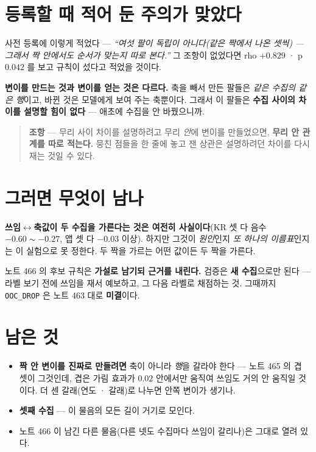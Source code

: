 \documentclass[11pt]{article}
\begin{document}
\section{등록할 때 적어 둔 주의가 맞았다}

사전 등록에 이렇게 적었다 --- \emph{``여섯 팔이 독립이 아니다(같은 짝에서
나온 셋씩) --- 그래서 짝 안에서도 순서가 맞는지 따로 본다.''} 그 조항이
없었다면 rho $+0.829$ · p $0.042$ 를 보고 규칙이 섰다고 적었을 것이다.

\textbf{변이를 만드는 것과 변이를 얻는 것은 다르다.} 축을 빼서 만든
팔들은 \emph{같은 수집의 같은 행}이고, 바뀐 것은 모델에게 보여 주는
축뿐이다. 그래서 이 팔들은 \textbf{수집 사이의 차이를 설명할 힘이 없다}
--- 애초에 수집을 안 바꿨으니까.

\begin{quote}
\textbf{조항} --- 무리 사이 차이를 설명하려고 무리 \emph{안}에 변이를
만들었으면, \textbf{무리 안 관계를 따로 적는다.} 뭉친 점들을 한 줄에
놓고 잰 상관은 설명하려던 차이를 다시 재는 것일 수 있다.
\end{quote}

\section{그러면 무엇이 남나}

\textbf{쓰임$\leftrightarrow$축값이 두 수집을 가른다는 것은 여전히
사실이다}(KR 셋 다 음수 $-0.60 \sim -0.27$, 앱 셋 다 $-0.03$ 이상).
하지만 그것이 \emph{원인}인지 \emph{또 하나의 이름표}인지는 이 실험으로
못 정한다. 두 짝을 가르는 어떤 값이든 두 짝을 가른다.

노트 466 의 후보 규칙은 \textbf{가설로 남기되 근거를 내린다.} 검증은
\textbf{새 수집}으로만 된다 --- 라벨 보기 전에 쓰임을 재서 예보하고,
그 다음 라벨로 채점하는 것. 그때까지 \texttt{OOC\_DROP} 은 노트 463 대로
\textbf{미결}이다.

\section*{남은 것}

\begin{itemize}
\item \textbf{짝 안 변이를 진짜로 만들려면} 축이 아니라 \emph{행}을
갈라야 한다 --- 노트 465 의 겹 셋이 그것인데, 겹은 가림 효과가
$0.02$ 안에서만 움직여 쓰임도 거의 안 움직일 것이다. 더 센 갈래(연도 ·
갈래)로 나누면 안쪽 변이가 생기나.
\item \textbf{셋째 수집} --- 이 물음의 모든 길이 거기로 모인다.
\item 노트 466 이 남긴 다른 물음(다른 넷도 수집마다 쓰임이 갈리나)은
그대로 열려 있다.
\end{itemize}
\end{document}
